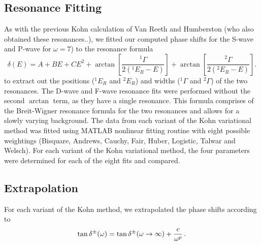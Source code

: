 \documentclass[preprint,showpacs,preprintnumbers,amsmath,amssymb]{revtex4}
\newcommand{\ee} {\,\text{e}}
\newcommand{\beq}{\begin{equation}}
\newcommand{\eeq}{\end{equation}}
\def \bea{\begin{eqnarray}}
\def \eea{\end{eqnarray}}
\newcommand{\todoi}{\todo[inline]}
\begin{document}
%
%

\subsection{Resonance Fitting}
As with the previous Kohn calculation of Van Reeth and Humberston (who also obtained these resonances..),
we fitted our computed phase shifts for the S-wave and P-wave for $\omega=7$) to
the resonance formula
\beq
\delta(E) = A + B E + C E^2 + \arctan \left[ \frac{^1\Gamma}{2(^1E_R - E)} \right] + \arctan \left[ \frac{^2\Gamma}{2(^2E_R - E)} \right].
\eeq
to extract out the positions ($^1E_R$ and $^2E_R$) and widths
($^1\Gamma$ and $^2\Gamma$) of the two resonances. The D-wave and F-wave resonance fits were performed without the second $\arctan$ term, as they have a single resonance. 
This formula comprises of the Breit-Wigner resonance
formula for the two resonances and allows for a slowly varying
background.
The data from each variant of the Kohn variational method was fitted using MATLAB nonlinear fitting routine with eight possible  weightings
(Bisquare, Andrews, Cauchy, Fair, Huber, Logistic, Talwar and Welsch).
For each variant of the Kohn variational method, the four parameters were determined for each
of the eight fits and compared.

\subsection{Extrapolation}
For each variant of the Kohn method, we extrapolated the phase shifts according to 
\bea
\tan\delta^\pm(\omega) = \tan\delta^\pm(\omega\to\infty) + {c\over \omega^p}\, .
\eea
\end{document}
